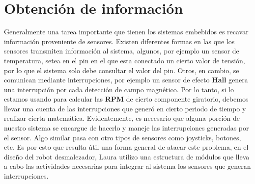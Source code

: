 \newpage
\section{Obtención de información}

Generalmente una tarea importante que tienen los sistemas embebidos es recavar información proveniente de sensores. Existen diferentes formas en las que los sensores transmiten información al sistema, algunos, por ejemplo un sensor de temperatura, setea en el pin en el que esta conectado un cierto valor de tensión, por lo que el sistema solo debe consultar el valor del pin. Otros, en cambio, se comunican mediante interrupciones, por ejemplo un sensor de efecto \textbf{Hall} genera una interrupción por cada detección de campo magnético. Por lo tanto, si lo estamos usando para calcular las \textbf{RPM} de cierto componente giratorio, debemos llevar una cuenta de las interrupciones que generó en cierto periodo de tiempo y realizar cierta matemática. Evidentemente, es necesario que alguna porción de nuestro sistema se encargue de hacerlo y maneje las interrupciones generadas por el sensor. Algo similar pasa con otro tipos de sensores como joysticks, botones, etc. Es por esto que resulta útil una forma general de atacar este problema, en el diseño del robot desmalezador, Laura utilizo una estructura de módulos que lleva a cabo las actividades necesarias para integrar al sistema los sensores que generan interrupciones.

